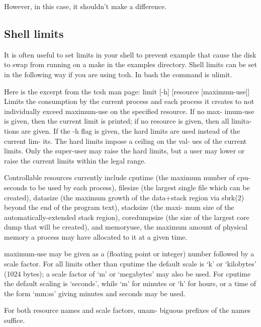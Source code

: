 \documentclass[titlepage,11pt]{article}
\begin{document}
  However, in this case, it shouldn't make a difference.

  \subsection{Shell limits}
  It is often useful to set limits in your shell to prevent example that cause
the disk to swap from running on a make in the examples directory. Shell
limits can be set in the following way if you are using tcsh. In bash the
command is ulimit.

  Here is the excerpt from the tcsh man page:
   limit [-h] [resource [maximum-use]]
         Limits the consumption by the current process  and
         each process it creates to not individually exceed
         maximum-use on the specified resource.  If no max-
         imum-use  is  given,  then  the  current  limit is
         printed; if no resource is given, then all limita-
         tions  are  given.   If  the -h flag is given, the
         hard limits are used instead of the  current  lim-
         its.  The hard limits impose a ceiling on the val-
         ues of the current limits.   Only  the  super-user
         may raise the hard limits, but a user may lower or
         raise the current limits within the legal range.

         Controllable resources currently  include  cputime
         (the  maximum  number of cpu-seconds to be used by
         each process), filesize (the largest  single  file
         which  can  be  created),  datasize  (the  maximum
         growth of the data+stack region via sbrk(2) beyond
         the end of the program text), stacksize (the maxi-
         mum  size  of  the  automatically-extended   stack
         region),  coredumpsize  (the  size  of the largest
         core dump that will be  created),  and  memoryuse,
         the  maximum  amount  of physical memory a process
         may have allocated to it at a given time.

         maximum-use may be given as a (floating  point  or
         integer)  number  followed by a scale factor.  For
         all limits other than cputime the default scale is
         `k' or `kilobytes' (1024 bytes); a scale factor of
         `m' or `megabytes' may also be used.  For  cputime
         the  default  scaling  is `seconds', while `m' for
         minutes or `h' for hours, or a time  of  the  form
         `mm:ss' giving minutes and seconds may be used.

         For  both  resource names and scale factors, unam-
         biguous prefixes of the names suffice.
\end{document}

